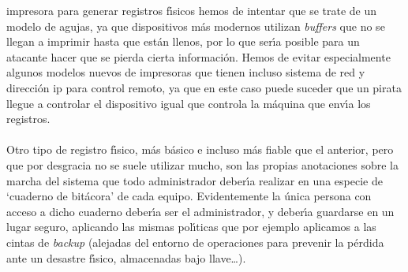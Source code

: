 impresora para generar registros f\'{\i}sicos hemos de intentar que se trate
de un modelo de agujas, ya que dispositivos m\'as modernos utilizan {\it 
buffers} que no se llegan a imprimir hasta que est\'an llenos, por lo que 
ser\'{\i}a posible para un atacante hacer que se pierda cierta informaci\'on.
Hemos de evitar especialmente algunos modelos nuevos de impresoras que tienen
incluso sistema de red y direcci\'on {\sc ip} para control remoto, ya que
en este caso puede suceder que un pirata llegue a controlar el dispositivo 
igual que controla la m\'aquina que env\'{\i}a los registros.\\
\\Otro tipo de registro f\'{\i}sico, m\'as b\'asico e incluso m\'as fiable que
el anterior, pero que por desgracia no se suele utilizar mucho, son las propias
anotaciones sobre la marcha del sistema que todo administrador deber\'{\i}a
realizar en una especie de `cuaderno de bit\'acora' de cada equipo. 
Evidentemente la \'unica persona con acceso a dicho cuaderno deber\'{\i}a ser
el administrador, y deber\'{\i}a guardarse en un lugar seguro, aplicando las
mismas pol\'{\i}ticas que por ejemplo aplicamos a las cintas de {\it backup}
(alejadas del entorno de operaciones para prevenir la p\'erdida ante un
desastre f\'{\i}sico, almacenadas bajo llave\ldots).
